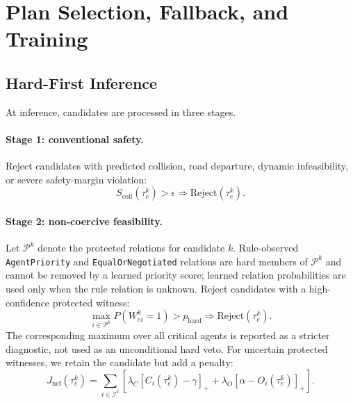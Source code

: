 \documentclass[10pt]{article}
\begin{document}
\section{Plan Selection, Fallback, and Training}
\label{app:selection_training}

\subsection{Hard-First Inference}
\label{app:hard_first}

At inference, candidates are processed in three stages.

\paragraph{Stage 1: conventional safety.}
Reject candidates with predicted collision, road departure, dynamic infeasibility, or severe safety-margin violation:
\begin{equation}
    S_{\mathrm{coll}}(\tau^k_e)>\epsilon
    \Rightarrow
    \mathrm{Reject}(\tau^k_e).
\end{equation}

\paragraph{Stage 2: non-coercive feasibility.}
Let $\mathcal P^k$ denote the protected relations for candidate $k$.  Rule-observed \texttt{AgentPriority} and \texttt{EqualOrNegotiated} relations are hard members of $\mathcal P^k$ and cannot be removed by a learned priority score; learned relation probabilities are used only when the rule relation is unknown.  Reject candidates with a high-confidence protected witness:
\begin{equation}
    \max_{i\in\mathcal P^k}
    P(W^k_{ei}=1)
    >
    p_{\mathrm{hard}}
    \Rightarrow
    \mathrm{Reject}(\tau^k_e).
\end{equation}
The corresponding maximum over all critical agents is reported as a stricter diagnostic, not used as an unconditional hard veto.  For uncertain protected witnesses, we retain the candidate but add a penalty:
\begin{equation}
    J_{\mathrm{ncf}}(\tau^k_e)
    =
    \sum_{i\in\mathcal{I}^k}
    \left[
    \lambda_C [C_i(\tau^k_e)-\gamma]_+
    +
    \lambda_O [\alpha-O_i(\tau^k_e)]_+
    \right].
\end{equation}
\end{document}
